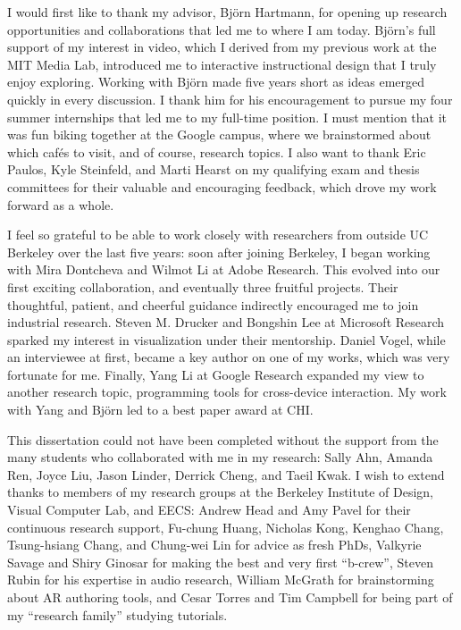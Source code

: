 \begin{acknowledgements}

I would first like to thank my advisor, Bj\"orn Hartmann, for opening up research opportunities and collaborations that led me to where I am today.
%
Bj\"orn's full support of my interest in video, which I derived from my previous work at the MIT Media Lab, introduced me to interactive instructional design that I truly enjoy exploring. Working with Bj\"orn made five years short as ideas emerged quickly in every discussion. I thank him for his encouragement to pursue my four summer internships that led me to my full-time position. I must mention that it was fun biking together at the Google campus, where we brainstormed about which caf\'{e}s to visit, and of course, research topics.
I also want to thank Eric Paulos, Kyle Steinfeld, and Marti Hearst on my qualifying exam and thesis committees for their valuable and encouraging feedback, which drove my work forward as a whole.

I feel so grateful to be able to work closely with researchers from outside UC Berkeley over the last five years: soon after joining Berkeley, I began working with Mira Dontcheva and Wilmot Li at Adobe Research. This evolved into our first exciting collaboration, and eventually three fruitful projects. Their thoughtful, patient, and cheerful guidance indirectly encouraged me to join industrial research.
%
Steven M. Drucker and Bongshin Lee at Microsoft Research sparked my interest in visualization under their mentorship.
%
Daniel Vogel, while an interviewee at first, became a key author on one of my works, which was very fortunate for me.
%
Finally, Yang Li at Google Research expanded my view to another research topic, programming tools for cross-device interaction. My work with Yang and Bj\"orn led to a best paper award at CHI.

This dissertation could not have been completed without the support from the many students who collaborated with me in my research: Sally Ahn, Amanda Ren, Joyce Liu, Jason Linder, Derrick Cheng, and Taeil Kwak. I wish to extend thanks to members of my research groups at the Berkeley Institute of Design, Visual Computer Lab, and EECS: Andrew Head and Amy Pavel for their continuous research support, Fu-chung Huang, Nicholas Kong, Kenghao Chang, Tsung-hsiang Chang, and Chung-wei Lin for advice as fresh PhDs, Valkyrie Savage and Shiry Ginosar for making the best and very first ``b-crew'', Steven Rubin for his expertise in audio research, William McGrath for brainstorming about AR authoring tools, and Cesar Torres and Tim Campbell for being part of my ``research family'' studying tutorials.


\end{acknowledgements}
